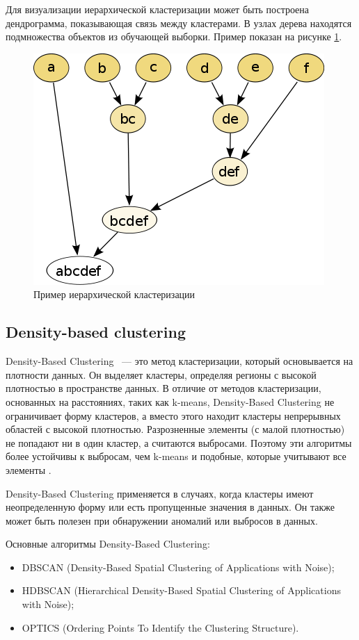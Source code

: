 Для визуализации иерархической кластеризации может быть построена дендрограмма, показывающая связь между кластерами. В узлах дерева находятся подмножества объектов из обучающей выборки. Пример показан на рисунке \ref{img:hierarchy-example}.

\begin{figure}[h]
    \centering
    \includegraphics{images/hierarchy-example.png}
    \caption{Пример иерархической кластеризации}
    \label{img:hierarchy-example}
\end{figure}


\subsection{Density-based clustering}
Density-Based Clustering ~--- это метод кластеризации, который основывается на плотности данных. Он выделяет кластеры, определяя регионы с высокой плотностью в пространстве данных. В отличие от методов кластеризации, основанных на расстояниях, таких как k-means, Density-Based Clustering не ограничивает форму кластеров, а вместо этого находит кластеры непрерывных областей с высокой плотностью. Разрозненные элементы (с малой плотностью) не попадают ни в один кластер, а считаются выбросами. Поэтому эти алгоритмы более устойчивы к выбросам, чем k-means и подобные, которые учитывают все элементы \cite{no-patterns, deep-clustering-survey}.

Density-Based Clustering применяется в случаях, когда кластеры имеют неопределенную форму или есть пропущенные значения в данных. Он также может быть полезен при обнаружении аномалий или выбросов в данных.

Основные алгоритмы Density-Based Clustering:
\begin{itemize}
    \item DBSCAN (Density-Based Spatial Clustering of Applications with Noise);
    \item HDBSCAN (Hierarchical Density-Based Spatial Clustering of Applications with Noise);
    \item OPTICS (Ordering Points To Identify the Clustering Structure).
\end{itemize}

